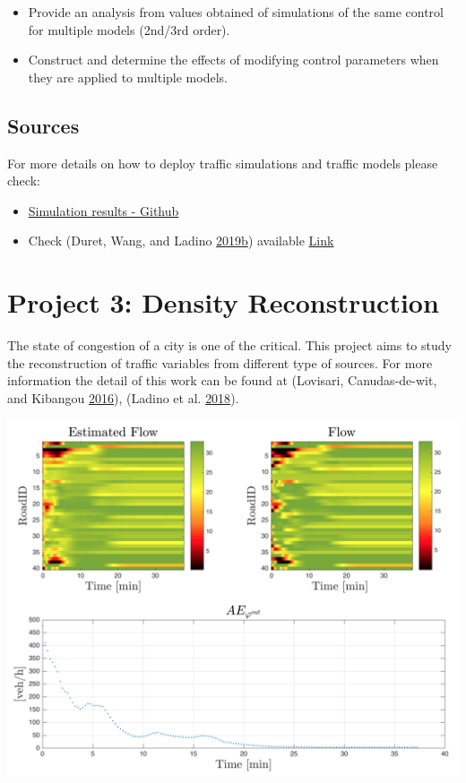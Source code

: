 \documentclass[]{book}
\providecommand{\tightlist}{%
  \setlength{\itemsep}{0pt}\setlength{\parskip}{0pt}}
\theoremstyle{definition}
\theoremstyle{definition}
\theoremstyle{definition}
\theoremstyle{remark}
\begin{document}
\begin{itemize}
\tightlist
\item
  Provide an analysis from values obtained of simulations of the same
  control for multiple models (2nd/3rd order).
\item
  Construct and determine the effects of modifying control parameters
  when they are applied to multiple models.
\end{itemize}

\hypertarget{sources-1}{%
\section*{Sources}\label{sources-1}}

For more details on how to deploy traffic simulations and traffic models
please check:

\begin{itemize}
\item
  \href{https://github.com/research-licit/Hierarchical-Platooning/blob/dev/Operational/platoon-closed-3rd.py}{Simulation
  results - Github}
\item
  Check (Duret, Wang, and Ladino
  \protect\hyperlink{ref-Duret2019}{2019}\protect\hyperlink{ref-Duret2019}{b})
  available \href{http://bit.ly/Hierarchical_ISTTT}{Link}
\end{itemize}

\hypertarget{project-3-density-reconstruction}{%
\chapter*{Project 3: Density
Reconstruction}\label{project-3-density-reconstruction}}

The state of congestion of a city is one of the critical. This project
aims to study the reconstruction of traffic variables from different
type of sources. For more information the detail of this work can be
found at (Lovisari, Canudas-de-wit, and Kibangou
\protect\hyperlink{ref-Lovisari2016}{2016}), (Ladino et al.
\protect\hyperlink{ref-Ladino2018}{2018}).

\includegraphics{images/p4-01-density.png}
\end{document}
